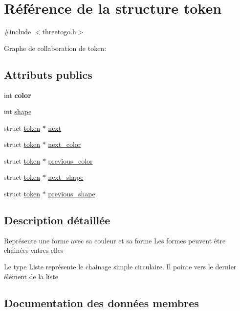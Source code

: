 \hypertarget{structtoken}{}\section{Référence de la structure token}
\label{structtoken}


{\ttfamily \#include $<$threetogo.\+h$>$}



Graphe de collaboration de token\+:
\subsection*{Attributs publics}
\begin{DoxyCompactItemize}
\item 
\mbox{\label{structtoken_aaa93d88403be1e2e2f0113e39eb667cf}} 
int {\bfseries color}
\item 
int \hyperlink{structtoken_a314611343d3c7ae65b11356fd5618ea1}{shape}
\item 
struct \hyperlink{structtoken}{token} $\ast$ \hyperlink{structtoken_ab58ee0c791a215865addb101d174b38a}{next}
\item 
struct \hyperlink{structtoken}{token} $\ast$ \hyperlink{structtoken_aeeac6077761a45ebc4d41150cb8e0b22}{next\+\_\+color}
\item 
struct \hyperlink{structtoken}{token} $\ast$ \hyperlink{structtoken_acd6e4c0c716198eb9ea04af1e36cf458}{previous\+\_\+color}
\item 
struct \hyperlink{structtoken}{token} $\ast$ \hyperlink{structtoken_a18af74e038da24435e31faf1b208ddca}{next\+\_\+shape}
\item 
struct \hyperlink{structtoken}{token} $\ast$ \hyperlink{structtoken_ac4c029efc61de4a5e927d55fd585eb70}{previous\+\_\+shape}
\end{DoxyCompactItemize}


\subsection{Description détaillée}
Représente une forme avec sa couleur et sa forme Les formes peuvent être chainées entres elles

Le type Liste représente le chainage simple circulaire. Il pointe vers le dernier élément de la liste 

\subsection{Documentation des données membres}
\mbox{\label{structtoken_ab58ee0c791a215865addb101d174b38a}} 
